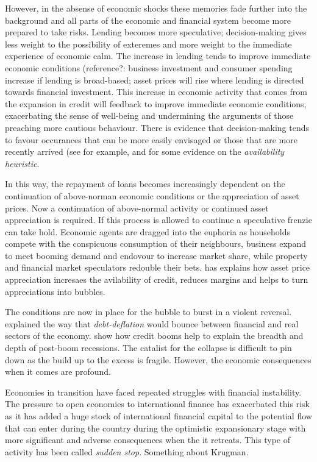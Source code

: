 \documentclass[12pt, a4paper, oneside]{article} %
\begin{document}
However, in the absense of economic shocks these memories fade further into the background and all parts of the economic and financial system become more prepared to take risks.  Lending becomes more speculative; decision-making gives less weight to the possibility of exteremes and more weight to the immediate experience of economic calm.  The increase in lending tends to improve immediate economic conditions (reference?:  business investment and consumer spending increase if lending is broad-based; asset prices will rise where lending is directed towards financial investment.  This increase in economic activity that comes from the expansion in credit will feedback to improve immediate economic conditions, exacerbating the sense of well-being and undermining the arguments of those preaching more cautious behaviour.  There is evidence that decision-making tends to favour occurances that can be more easily envisaged or those that are more recently arrived (see for example, \citet{KTAvailability} and \citet{Schwartzavailability} for some evidence on the \emph{availability heuristic}.   

In this way, the repayment of loans becomes increasingly dependent on the continuation of above-norman economic conditions or the appreciation of asset prices. Now a continuation of above-normal activity or continued asset appreciation is required. If this process is allowed to continue a speculative frenzie can take hold.  Economic agents are dragged into the euphoria as households compete with the conspicuous consumption of their neighbours, business expand to meet booming demand and endovour to increase market share, while property and financial market speculators redouble their bets.  \citet{BrunnermeierLiquidity} has explains how asset price appreciation incresaes the avilability of credit, reduces margins and helps to turn appreciations into bubbles. 

The conditions are now in place for the bubble to burst in a violent reversal.  \citet{FisherBD, FisherDD} explained the way that \emph{debt-deflation} would bounce between financial and real sectors of the economy.    \citet{ReinhartRogoff} show how credit booms help to explain the breadth and depth of post-boom recessions.  The catalist for the collapse is difficult to pin down as the build up to the excess is fragile.  However, the economic consequences when it comes are profound.  



Economies in transition have faced repeated struggles with financial instability.  The pressure to open economies to international finance has exacerbated this risk as it has added a huge stock of international financial capital to the potential flow that can enter during the country during the optimistic expansionary stage with more significant and adverse consequences when the it retreats.  This type of activity has been called \emph{sudden stop}.  Something about Krugman. 
\end{document}
